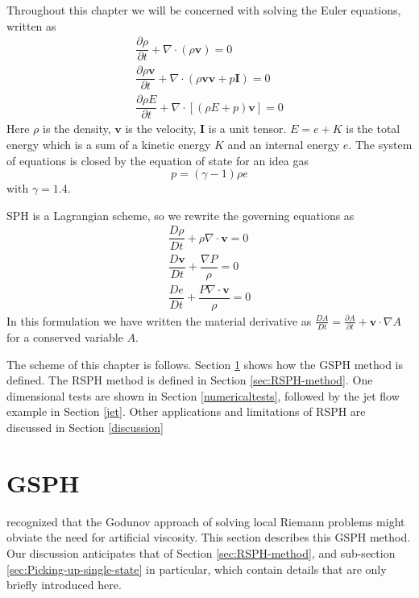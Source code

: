 Throughout this chapter we will be concerned with solving the Euler equations, written as
\begin{align}
\dfrac{\partial \rho}{\partial t} + \nabla \cdot \left(\rho \textbf{v} \right) = 0 \label{eq:gov-cs-rho-erl} \\
\dfrac{\partial \rho \textbf{v}}{\partial t} + \nabla \cdot \left(\rho \textbf{v} \textbf{v} + p\textbf{I}\right) = 0 \label{eq:gov-cs-v-erl} \\
\dfrac{\partial \rho E}{\partial t} + \nabla \cdot \left[\left(\rho E + p \right)\textbf{v}\right] = 0 \label{eq:gov-cs-e-erl}
\end{align}
Here $\rho$ is the density, $\textbf{v}$ is the velocity, $\textbf{I}$ is a unit tensor.
$E = e + K $ is the total energy which is a sum of a kinetic energy $K$ and an internal energy $e$.
The system of equations is closed by the equation of state for an idea gas
\begin{equation}
p = \left(\gamma - 1\right)\rho e \label{eq:EOS-erl}
\end{equation}
with $\gamma=1.4$.

SPH is a Lagrangian scheme, so we rewrite the governing equations as
\begin{align}   %
\dfrac{D \rho}{D t} + \rho \nabla \cdot \textbf{v} = 0 \label{eq:gov-nc-rho-erl}\\
\dfrac{D \textbf{v}}{D t} + \dfrac{\nabla P}{\rho} =0 \label{eq:gov-nc-v-erl}\\
\dfrac{D e}{D t} + \dfrac{P \nabla \cdot \textbf{v}}{\rho} = 0 \label{eq:gov-nc-e-erl}
\end{align}
In this formulation we have written the material derivative as 
$\frac{D A}{Dt} = \frac{\partial A}{\partial t} + \textbf{v} \cdot \nabla A$ for a conserved variable $A$.

The scheme of this chapter is follows. Section \ref{sec:GSPH-method} shows how the GSPH method is defined. The RSPH method is defined in Section \ref{sec:RSPH-method}.
One dimensional tests are shown in Section \ref{numericaltests}, followed by the jet flow example in Section \ref{jet}. Other applications and limitations of RSPH are discussed in Section \ref{discussion}

\section{GSPH} \label{sec:GSPH-method}
\citet{inutsuka2002reformulation} recognized that the Godunov approach of solving local Riemann problems might obviate the need for artificial viscosity. This section describes this GSPH method. Our discussion anticipates that of Section \ref{sec:RSPH-method}, and sub-section \ref{sec:Picking-up-single-state} in particular, which contain details that are only briefly introduced here.

